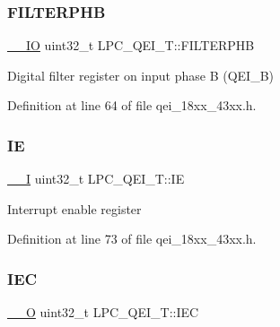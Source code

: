 \mbox{\label{struct_l_p_c___q_e_i___t_a385bbf02e2aa20edde97366861e0ef8d}} 
\subsubsection{\texorpdfstring{F\+I\+L\+T\+E\+R\+P\+HB}{FILTERPHB}}
{\footnotesize\ttfamily \hyperlink{core__sc300_8h_aec43007d9998a0a0e01faede4133d6be}{\+\_\+\+\_\+\+IO} uint32\+\_\+t L\+P\+C\+\_\+\+Q\+E\+I\+\_\+\+T\+::\+F\+I\+L\+T\+E\+R\+P\+HB}

Digital filter register on input phase B (Q\+E\+I\+\_\+B) 

Definition at line 64 of file qei\+\_\+18xx\+\_\+43xx.\+h.

\mbox{\label{struct_l_p_c___q_e_i___t_a89eace37d24d618b12322f0479b3aefd}} 
\subsubsection{\texorpdfstring{IE}{IE}}
{\footnotesize\ttfamily \hyperlink{core__sc300_8h_af63697ed9952cc71e1225efe205f6cd3}{\+\_\+\+\_\+I} uint32\+\_\+t L\+P\+C\+\_\+\+Q\+E\+I\+\_\+\+T\+::\+IE}

Interrupt enable register 

Definition at line 73 of file qei\+\_\+18xx\+\_\+43xx.\+h.

\mbox{\label{struct_l_p_c___q_e_i___t_ad4164e0990c509994c19caccf1f7cf61}} 
\subsubsection{\texorpdfstring{I\+EC}{IEC}}
{\footnotesize\ttfamily \hyperlink{core__sc300_8h_a7e25d9380f9ef903923964322e71f2f6}{\+\_\+\+\_\+O} uint32\+\_\+t L\+P\+C\+\_\+\+Q\+E\+I\+\_\+\+T\+::\+I\+EC}

